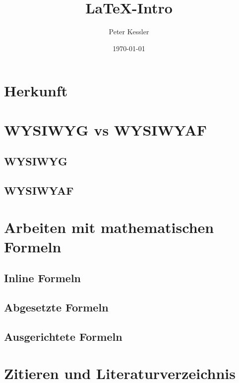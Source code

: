 \documentclass[ 12pt, a4paper, parskip=full]{scrartcl}
\title{\LaTeX-Intro}          %
\author{Peter Kessler}        %
\date{\today}                 %
\begin{document}
\maketitle
\thispagestyle{empty}         

\pagebreak
\tableofcontents

\pagebreak 
\section{Herkunft}


\pagebreak
\section{WYSIWYG vs WYSIWYAF}

\subsection{WYSIWYG}


\subsection{WYSIWYAF}


\pagebreak
\section{Arbeiten mit mathematischen Formeln}


\subsection{Inline Formeln}


\subsection{Abgesetzte Formeln}


\subsection{Ausgerichtete Formeln}


\pagebreak
\section{Zitieren und Literaturverzeichnis}


\pagebreak


\printbibliography[title={Literatur-/Quellenverzeichnis}]        
\end{document}
